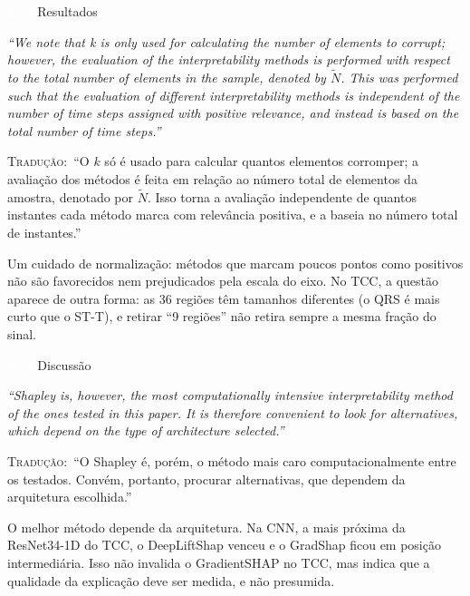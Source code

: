 \documentclass[11pt,a4paper]{article}
\newcommand{\pagechip}[1]{{\setlength{\fboxsep}{1.5pt}\colorbox{cAcc}{\textcolor{white}{\scriptsize\texttt{#1}}}}}
\newenvironment{origquote}{\par\itshape\small}{\par}
\newenvironment{tradquote}{\par\small\textsc{Tradução:}\ }{\par}
\newcommand{\explab}[1]{\par\smallskip{\small\color{cAcc}\textbf{\MakeUppercase{#1}}}\par}
\begin{document}
\begin{citacard}{\pagechip{p. 3} Resultados}
\begin{origquote}“We note that k is only used for calculating the number of elements to corrupt; however, the evaluation of the interpretability methods is performed with respect to the total number of elements in the sample, denoted by $\tilde{N}$. This was performed such that the evaluation of different interpretability methods is independent of the number of time steps assigned with positive relevance, and instead is based on the total number of time steps.”\end{origquote}
\begin{tradquote}“O $k$ só é usado para calcular quantos elementos corromper; a avaliação dos métodos é feita em relação ao número total de elementos da amostra, denotado por $\tilde{N}$. Isso torna a avaliação independente de quantos instantes cada método marca com relevância positiva, e a baseia no número total de instantes.”\end{tradquote}
\explab{Explicação}
Um cuidado de normalização: métodos que marcam poucos pontos como positivos não são favorecidos nem prejudicados pela escala do eixo. No TCC, a questão aparece de outra forma: as 36 regiões têm tamanhos diferentes (o QRS é mais curto que o ST-T), e retirar “9 regiões” não retira sempre a mesma fração do sinal.
\end{citacard}

\begin{citacard}{\pagechip{p. 4} Discussão}
\begin{origquote}“Shapley is, however, the most computationally intensive interpretability method of the ones tested in this paper. It is therefore convenient to look for alternatives, which depend on the type of architecture selected.”\end{origquote}
\begin{tradquote}“O Shapley é, porém, o método mais caro computacionalmente entre os testados. Convém, portanto, procurar alternativas, que dependem da arquitetura escolhida.”\end{tradquote}
\explab{Explicação}
O melhor método depende da arquitetura. Na CNN, a mais próxima da ResNet34-1D do TCC, o DeepLiftShap venceu e o GradShap ficou em posição intermediária. Isso não invalida o GradientSHAP no TCC, mas indica que a qualidade da explicação deve ser medida, e não presumida.
\end{citacard}
\end{document}
